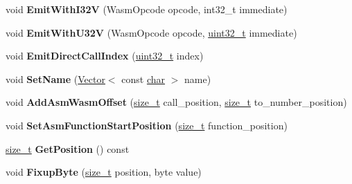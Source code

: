 \begin{DoxyCompactItemize}
void {\bfseries Emit\+With\+I32V} (Wasm\+Opcode opcode, int32\+\_\+t immediate)
\item 
\mbox{\label{classv8_1_1internal_1_1wasm_1_1WasmFunctionBuilder_aac7d473733a21340a8015d23f9ad6d62}} 
void {\bfseries Emit\+With\+U32V} (Wasm\+Opcode opcode, \mbox{\hyperlink{classuint32__t}{uint32\+\_\+t}} immediate)
\item 
\mbox{\label{classv8_1_1internal_1_1wasm_1_1WasmFunctionBuilder_a5aedc04f520f9e7864f29bda334213c1}} 
void {\bfseries Emit\+Direct\+Call\+Index} (\mbox{\hyperlink{classuint32__t}{uint32\+\_\+t}} index)
\item 
\mbox{\label{classv8_1_1internal_1_1wasm_1_1WasmFunctionBuilder_a30c224c34a921d70f50dec996d233806}} 
void {\bfseries Set\+Name} (\mbox{\hyperlink{classv8_1_1internal_1_1Vector}{Vector}}$<$ const \mbox{\hyperlink{classchar}{char}} $>$ name)
\item 
\mbox{\label{classv8_1_1internal_1_1wasm_1_1WasmFunctionBuilder_a91ea4239b6380384cc45a479d8338c68}} 
void {\bfseries Add\+Asm\+Wasm\+Offset} (\mbox{\hyperlink{classsize__t}{size\+\_\+t}} call\+\_\+position, \mbox{\hyperlink{classsize__t}{size\+\_\+t}} to\+\_\+number\+\_\+position)
\item 
\mbox{\label{classv8_1_1internal_1_1wasm_1_1WasmFunctionBuilder_a71d9691327016f577e084a48bd90625b}} 
void {\bfseries Set\+Asm\+Function\+Start\+Position} (\mbox{\hyperlink{classsize__t}{size\+\_\+t}} function\+\_\+position)
\item 
\mbox{\label{classv8_1_1internal_1_1wasm_1_1WasmFunctionBuilder_a7f2e2fe37b09bd733b19df2bb1ed16de}} 
\mbox{\hyperlink{classsize__t}{size\+\_\+t}} {\bfseries Get\+Position} () const
\item 
\mbox{\label{classv8_1_1internal_1_1wasm_1_1WasmFunctionBuilder_a8016ff0c8b761293232b4592442948f5}} 
void {\bfseries Fixup\+Byte} (\mbox{\hyperlink{classsize__t}{size\+\_\+t}} position, byte value)

\end{DoxyCompactItemize}
